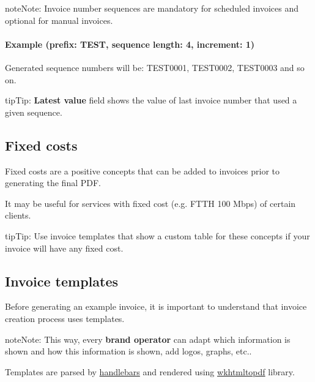 \documentclass[letterpaper,10pt,english]{sphinxmanual}
\begin{document}
\begin{notice}{note}{Note:}
Invoice number sequences are mandatory for scheduled invoices and optional for manual invoices.
\end{notice}
\paragraph{Example (prefix: TEST, sequence length: 4, increment: 1)}

Generated sequence numbers will be: TEST0001, TEST0002, TEST0003 and so on.

\begin{notice}{tip}{Tip:}
\textbf{Latest value} field shows the value of last invoice number that used a given sequence.
\end{notice}


\subsection{Fixed costs}
\label{administration_portal/brand/invoicing/fixed_costs:fixed-costs}\label{administration_portal/brand/invoicing/fixed_costs::doc}
Fixed costs are a positive concepts that can be added to invoices prior to generating the final PDF.

It may be useful for services with fixed cost (e.g. FTTH 100 Mbps) of certain clients.

\begin{notice}{tip}{Tip:}
Use invoice templates that show a custom table for these concepts if your invoice will have any fixed cost.
\end{notice}


\subsection{Invoice templates}
\label{administration_portal/brand/invoicing/invoice_templates::doc}\label{administration_portal/brand/invoicing/invoice_templates:invoice-templates}
Before generating an example invoice, it is important to understand that invoice
creation process uses templates.

\begin{notice}{note}{Note:}
This way, every \textbf{brand operator} can adapt which information
is shown and how this information is shown, add logos, graphs, etc..
\end{notice}

Templates are parsed by \href{https://github.com/XaminProject/handlebars.php}{handlebars} and rendered
using \href{https://wkhtmltopdf.org/}{wkhtmltopdf} library.
\end{document}
